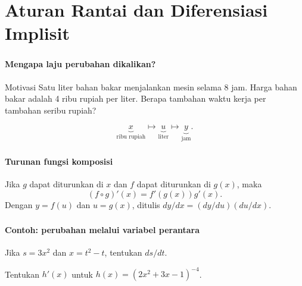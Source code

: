 \documentclass{../../kalkulus-ppt}
\begin{document}
\section{Aturan Rantai dan Diferensiasi Implisit}

\begin{frame}
\frametitle{\insertsection}
\framesubtitle{Mengapa laju perubahan dikalikan?}

\begin{block}{Motivasi}
Satu liter bahan bakar menjalankan mesin selama 8 jam. Harga bahan bakar adalah 4 ribu rupiah per liter. Berapa tambahan waktu kerja per tambahan seribu rupiah?
\end{block}
\[\underbrace{x}_{\text{ribu rupiah}}\longmapsto
\underbrace{u}_{\text{liter}}\longmapsto
\underbrace{y}_{\text{jam}}.\]
\end{frame}


\begin{frame}
\frametitle{\insertsection}
\framesubtitle{Turunan fungsi komposisi}

\begin{teorema}
Jika $g$ dapat diturunkan di $x$ dan $f$ dapat diturunkan di $g(x)$, maka
\[(f\circ g)'(x)=f'(g(x))g'(x).\]
Dengan $y=f(u)$ dan $u=g(x)$, ditulis $dy/dx=(dy/du)(du/dx)$.
\end{teorema}
\end{frame}


\begin{frame}
\frametitle{\insertsection}
\framesubtitle{Contoh: perubahan melalui variabel perantara}

\begin{contoh}
Jika $s=3x^2$ dan $x=t^2-t$, tentukan $ds/dt$.
\end{contoh}
\begin{contoh}
Tentukan $h'(x)$ untuk $h(x)=(2x^2+3x-1)^{-4}$.
\end{contoh}
\end{frame}
\end{document}
